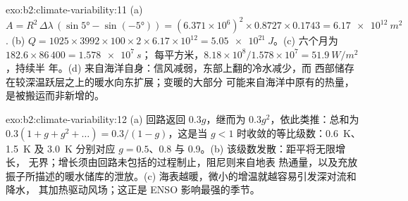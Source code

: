 \begin{solution}{exo:b2:climate-variability:11}
(a) $A = R^2 \,\Delta\lambda\,(\sin\ang{5} - \sin(\ang{-5})) = (6.371 \times 10^6)^2 \times 0.8727
\times 0.1743 = \qty{6.17e12}{m^2}$. (b) $Q = 1025 \times 3992 \times 100 \times 2 \times 6.17
\times 10^{12} = \qty{5.05e21}{J}$。(c) 六个月为 $182.6 \times 86\,400 = \qty{1.578e7}{s}$；
每平方米，$8.18 \times 10^8/1.578 \times 10^7 = \qty{51.9}{W/m^2}$，持续半
年。(d) 来自海洋自身：信风减弱，东部上翻的冷水减少，而
西部储存在较深温跃层之上的暖水向东扩展；变暖的大部分
可能来自海洋中原有的热量，是被搬运而非新增的。
\end{solution}

\begin{solution}{exo:b2:climate-variability:12}
(a) 回路返回 $0.3g$，继而为 $0.3g^2$，依此类推：总和为 $0.3(1 + g + g^2 + \dots) =
0.3/(1 - g)$，这是当 $g < 1$ 时收敛的等比级数：\qty{0.6}{K}、\qty{1.5}{K} 及
\qty{3.0}{K} 分别对应 $g = 0.5$、0.8 与 0.9。(b) 该级数发散：距平将无限增长，
无界；增长须由回路未包括的过程制止，阻尼则来自地表
热通量，以及充放振子所描述的暖水储库的泄放。(c)
海表越暖，微小的增温就越容易引发深对流和降水，
其加热驱动风场；这正是 ENSO 影响最强的季节。
\end{solution}

